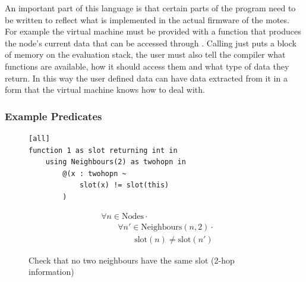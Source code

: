An important part of this language is that certain parts of the program need to be written to reflect what is implemented in the actual firmware of the motes. For example the virtual machine must be provided with a function that produces the node's current data that can be accessed through . Calling  just puts a block of memory on the evaluation stack, the user must also tell the compiler what functions are available, how it should access them and what type of data they return. In this way the user defined data can have data extracted from it in a form that the virtual machine knows how to deal with.

\subsubsection{Example Predicates}
\label{sec:example-predicates}

\begin{figure}[H]
\begin{minipage}{.5\linewidth}
\begin{lstlisting}[language=Hoppy]
[all]
function 1 as slot returning int in
    using Neighbours(2) as twohopn in
        @(x : twohopn ~
            slot(x) != slot(this)
        )
\end{lstlisting}
\end{minipage}%
\begin{minipage}{.5\linewidth}
\begin{align*}
&				\forall n \in \text{Nodes} \cdot \\
& \hspace{2em}		\forall n' \in \text{Neighbours}(n, 2) \cdot \\
& \hspace{4em}				\text{slot}(n) \neq \text{slot}(n')
\end{align*}
\end{minipage}

\caption{Check that no two neighbours have the same slot (2-hop information)}
\label{fig:two-hop-slot-pred-lang}
\end{figure}

